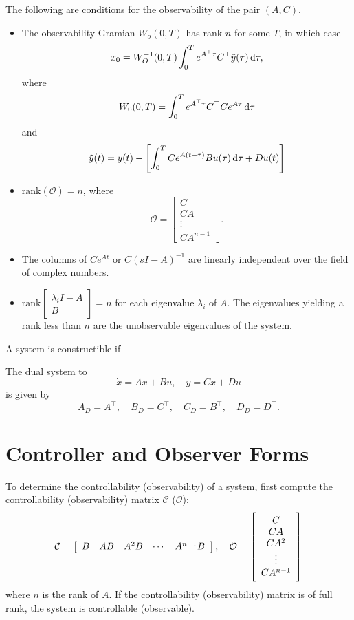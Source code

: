 \documentclass{report}
\begin{document}
The following are conditions for the observability of the pair
$(A,C)$.
\begin{itemize}
  \item{
    The observability Gramian $W_o(0, T)$ has rank $n$ for some $T$,
    in which case
    $$
    x_0 =
    W_O^{-1}(0, T)\int_0^T e^{A^\top \tau} C^\top \tilde{y}(\tau) \dif
    \tau,
    $$
    where
    $$
    W_0(0, T) = \int_0^T e^{A^\top \tau} C^\top C e^{A \tau} \dif \tau
    $$
    and
    $$
    \tilde{y}(t)
    = y(t)
    - \left[
        \int_0^T C e^{A(t - \tau)} B u(\tau) \dif \tau + D u(t)
      \right]
    $$
  }
  \item{
    $\mathrm{rank}(\mathcal{O}) = n$, where
    $$
    \mathcal{O} =
    \left[\begin{array}{c}
      C        \\
      C A      \\
      \vdots   \\
      C A^{n-1}
    \end{array}\right].
    $$
  }
  \item{
    The columns of $C e^{A t}$ or $C (sI - A)^{-1}$ are linearly independent over the field
    of complex numbers.
  }
  \item{
    $\mathrm{rank}
       \left[\begin{array}{c}
         \lambda_i I - A \\
         B
       \end{array}\right] = n$ for each eigenvalue $\lambda_i$
    of $A$. The eigenvalues yielding a rank less than $n$ are the
    unobservable eigenvalues of the system.
  }
\end{itemize}

A system is constructible if

The dual system to
$$
\dot{x} = A x + B u, \quad
y = C x + D u
$$
is given by
$$
A_D = A^\top, \quad
B_D = C^\top, \quad
C_D = B^\top, \quad
D_D = D^\top.
$$

\section{Controller and Observer Forms}

To determine the controllability (observability) of a system, first compute
the controllability (observability) matrix $\mathcal{C}$ ($\mathcal{O}$):
$$
\mathcal{C} =
\left[\begin{array}{c c c c c}
  B & A B & A^2 B & \cdots & A^{n-1} B
\end{array}\right], \quad
\mathcal{O} =
\left[\begin{array}{c}
  C        \\
  C A      \\
  C A^2    \\
  \vdots   \\
  C A^{n-1}
\end{array}\right]
$$
where $n$ is the rank of $A$. If the controllability (observability)
matrix is of full rank, the system is controllable (observable).
\end{document}

